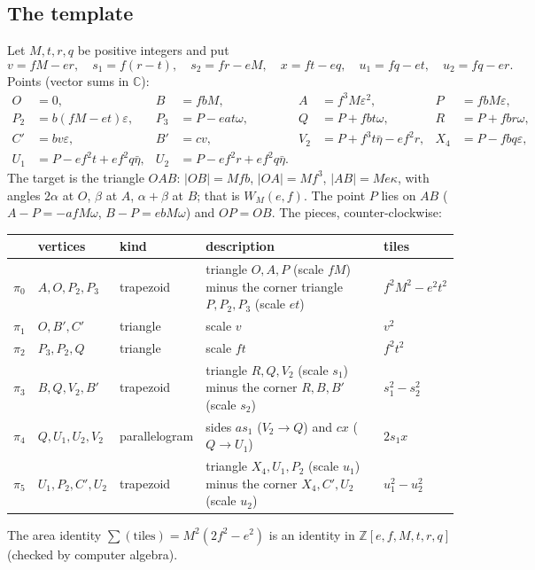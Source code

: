 \documentclass[11pt,reqno]{amsart}
\theoremstyle{plain}
\theoremstyle{definition}
\begin{document}
\subsection{The template}
Let $M,t,r,q$ be positive integers and put
\[
v=fM-er,\quad s_1=f(r-t),\quad s_2=fr-eM,\quad x=ft-eq,\quad u_1=fq-et,\quad u_2=fq-er .
\]
Points (vector sums in $\mathbb C$):
\begin{align*}
O&=0, & B&=fbM, & A&=f^3M\varepsilon^2, & P&=fbM\varepsilon,\\
P_2&=b(fM-et)\varepsilon, & P_3&=P-eat\omega, & Q&=P+fbt\omega, & R&=P+fbr\omega,\\
C'&=bv\varepsilon, & B'&=cv, & V_2&=P+f^3t\bar\eta-ef^2r, & X_4&=P-fbq\varepsilon,\\
U_1&=P-ef^2t+ef^2q\bar\eta, & U_2&=P-ef^2r+ef^2q\bar\eta .
\end{align*}
The target is the triangle $OAB$: $|OB|=Mfb$, $|OA|=Mf^3$, $|AB|=Me\kappa$, with angles $2\alpha$ at $O$, $\beta$ at $A$, $\alpha+\beta$ at $B$; that is $W_M(e,f)$. The point $P$ lies on $AB$ ($A-P=-afM\omega$, $B-P=ebM\omega$) and $OP=OB$.
The pieces, counter-clockwise:
\begin{center}\small
\begin{tabular}{@{}lllp{5.3cm}l@{}}
\toprule
 & vertices & kind & description & tiles\\
\midrule
$\pi_0$ & $A,O,P_2,P_3$ & trapezoid & triangle $O,A,P$ (scale $fM$) minus the corner triangle $P,P_2,P_3$ (scale $et$) & $f^2M^2-e^2t^2$\\
$\pi_1$ & $O,B',C'$ & triangle & scale $v$ & $v^2$\\
$\pi_2$ & $P_3,P_2,Q$ & triangle & scale $ft$ & $f^2t^2$\\
$\pi_3$ & $B,Q,V_2,B'$ & trapezoid & triangle $R,Q,V_2$ (scale $s_1$) minus the corner $R,B,B'$ (scale $s_2$) & $s_1^2-s_2^2$\\
$\pi_4$ & $Q,U_1,U_2,V_2$ & parallelogram & sides $a s_1$ ($V_2\to Q$) and $cx$ ($Q\to U_1$) & $2s_1x$\\
$\pi_5$ & $U_1,P_2,C',U_2$ & trapezoid & triangle $X_4,U_1,P_2$ (scale $u_1$) minus the corner $X_4,C',U_2$ (scale $u_2$) & $u_1^2-u_2^2$\\
\bottomrule
\end{tabular}
\end{center}
The area identity $\sum(\text{tiles})=M^2(2f^2-e^2)$ is an identity in $\mathbb Z[e,f,M,t,r,q]$ (checked by computer algebra).
\end{document}
